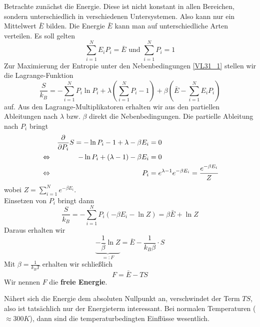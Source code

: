 \documentclass[]{article}
\begin{document}
Betrachte zunächst die Energie. Diese ist nicht konstant in allen Bereichen, sondern unterschiedlich in verschiedenen Untersystemen. Also kann nur ein Mittelwert $\bar{E}$ bilden. Die Energie $\bar{E}$ kann man auf unterschiedliche Arten verteilen. Es soll gelten
\begin{equation}
\sum_{i=1}^N E_i P_i = \bar{E} \text{ und } \sum_{i=1}^N P_i = 1 \label{VL31_1}
\end{equation}
Zur Maximierung der Entropie unter den Nebenbedingungen \eqref{VL31_1} stellen wir die Lagrange-Funktion
\begin{equation*}
\frac{S}{k_B} = - \sum_{i=1}^N P_i \ln P_i + \lambda \left( \sum_{i=1}^N P_i - 1 \right) + \beta \left( \bar{E} - \sum_{i=1}^N E_i P_i \right)
\end{equation*}
auf. Aus den Lagrange-Multiplikatoren erhalten wir aus den partiellen Ableitungen nach $\lambda$ bzw. $\beta$ direkt die Nebenbedingungen. Die partielle Ableitung nach $P_i$ bringt
\begin{align}
&&\frac{\partial}{\partial P_i} S = - \ln P_i - 1 + \lambda - \beta E_i &= 0 \notag \\
&\Leftrightarrow
&- \ln P_i + (\lambda -1) - \beta E_i &= 0 \notag \\
&\Leftrightarrow
&P_i &= e^{\lambda - 1} e^{-\beta E_i} = \frac{e^{-\beta E_i}}{Z} \label{VL31_2}
\end{align}
wobei $Z = \sum_{i=1}^N e^{-\beta E_i}$. \\
Einsetzen von $P_i$ bringt dann
\begin{equation*}
\frac{S}{k_B} = - \sum_{i=1}^N P_i \left( -\beta E_i - \ln Z \right) = \beta \bar{E} + \ln Z
\end{equation*}
Daraus erhalten wir 
\begin{equation*}
\underbrace{- \frac{1}{\beta} \ln Z}_{=:F} = \bar{E} - \frac{1}{k_B \beta} \cdot S
\end{equation*}
Mit $\beta = \frac{1}{k_B T}$ erhalten wir schließlich
\begin{equation*}
F = \bar{E} - T S
\end{equation*}
Wir nennen $F$ die \textbf{freie Energie}.

Nähert sich die Energie dem absoluten Nullpunkt an, verschwindet der  Term $T S$, also ist tatsächlich nur der Energieterm interessant. Bei normalen Temperaturen ($\approx 300 K$), dann sind die temperaturbedingten Einflüsse wesentlich.
\end{document}
